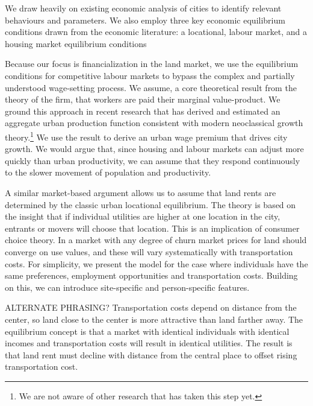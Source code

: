 {%

We draw heavily on existing economic analysis of cities to identify relevant behaviours and parameters. We also employ three key economic equilibrium conditions drawn from the economic literature: a locational, labour market, and a housing market equilibrium conditions

Because our focus is financialization in the land market, we use the equilibrium conditions for competitive labour markets to bypass the complex and partially understood wage-setting process. We assume, a core theoretical result from the theory of the firm, that workers are paid their \gls{marginal value-product}. We ground this approach in recent research that has derived and estimated an aggregate urban production function consistent with modern \gls{neoclassical growth theory}.\footnote{We are not aware of other research that has taken this step yet.} We use the result to derive an urban wage premium that drives city growth. We would argue that, since housing and labour markets can adjust more quickly than urban productivity, we can assume that they respond  continuously to the slower movement of population and productivity. %

A similar market-based argument allows us to assume that land rents are determined by the classic urban locational equilibrium. The theory is based on the insight that if individual utilities are higher at one location in the city, entrants or movers will choose that  location. This is an implication of consumer choice theory. In a market with any degree of churn market prices for land should converge on use values, and these will vary systematically with transportation costs. For simplicity, we present the model for the case where individuals have the same preferences, employment opportunities and transportation costs. Building on this, %
we can introduce site-specific and person-specific features. 

ALTERNATE PHRASING? Transportation costs depend on distance from the center, so land close to the center is more attractive than land farther away.  The equilibrium concept is that a market with identical individuals with identical incomes and transportation costs will result in identical utilities. The result is that land rent must decline with distance from the central place to offset rising transportation cost. 

}
